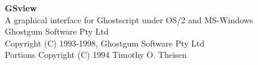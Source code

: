 %
%
\setlength{\textwidth}{160mm}
\setlength{\oddsidemargin}{5mm}
\setlength{\topmargin}{-12mm}
\setlength{\textheight}{240mm}
\setlength{\parskip}{1ex}
\setlength{\parindent}{0pt}


\pagestyle{empty}
   \rule{0in}{3in}
   \begin{center}
   {\huge\bf GSview}\\
   \vspace{3ex}
   {\Large A graphical interface for Ghostscript under OS/2 and MS-Windows}\\
   \vspace{2ex}
   \large
   Ghostgum Software Pty Ltd\\
   \vspace{2ex}
   Copyright (C) 1993-1998, Ghostgum Software Pty Ltd\\
   Portions Copyright (C) 1994   Timothy O. Theisen\\
   \end{center}
\newpage

\tableofcontents
\newpage

\setcounter{page}{1}
\pagestyle{myheadings}

